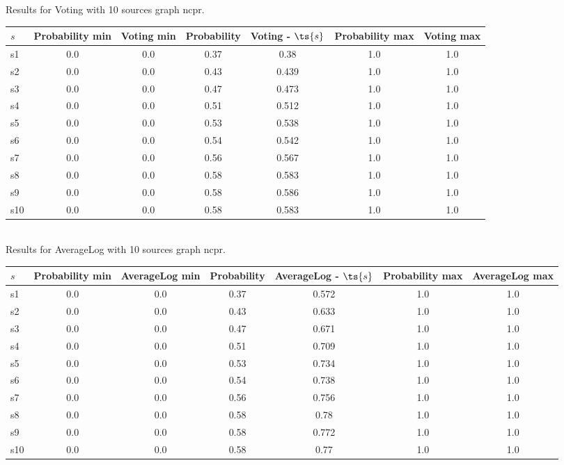 \documentclass{article}
\begin{document}
\noindent Results for Voting with 10 sources graph ncpr.

\noindent\begin{tabular}{|l|c|c|c|c|c|c|}
\hline
$s$& Probability min & Voting min & Probability & Voting - $\ts{s}$ & Probability max & Voting max\\
\hline
s1 &0.0 & 0.0 & 0.37 & 0.38 & 1.0 & 1.0\\
\hline
s2 &0.0 & 0.0 & 0.43 & 0.439 & 1.0 & 1.0\\
\hline
s3 &0.0 & 0.0 & 0.47 & 0.473 & 1.0 & 1.0\\
\hline
s4 &0.0 & 0.0 & 0.51 & 0.512 & 1.0 & 1.0\\
\hline
s5 &0.0 & 0.0 & 0.53 & 0.538 & 1.0 & 1.0\\
\hline
s6 &0.0 & 0.0 & 0.54 & 0.542 & 1.0 & 1.0\\
\hline
s7 &0.0 & 0.0 & 0.56 & 0.567 & 1.0 & 1.0\\
\hline
s8 &0.0 & 0.0 & 0.58 & 0.583 & 1.0 & 1.0\\
\hline
s9 &0.0 & 0.0 & 0.58 & 0.586 & 1.0 & 1.0\\
\hline
s10 &0.0 & 0.0 & 0.58 & 0.583 & 1.0 & 1.0\\
\hline
\end{tabular}\\

\noindent Results for AverageLog with 10 sources graph ncpr.

\noindent\begin{tabular}{|l|c|c|c|c|c|c|}
\hline
$s$& Probability min & AverageLog min & Probability & AverageLog - $\ts{s}$ & Probability max & AverageLog max\\
\hline
s1 &0.0 & 0.0 & 0.37 & 0.572 & 1.0 & 1.0\\
\hline
s2 &0.0 & 0.0 & 0.43 & 0.633 & 1.0 & 1.0\\
\hline
s3 &0.0 & 0.0 & 0.47 & 0.671 & 1.0 & 1.0\\
\hline
s4 &0.0 & 0.0 & 0.51 & 0.709 & 1.0 & 1.0\\
\hline
s5 &0.0 & 0.0 & 0.53 & 0.734 & 1.0 & 1.0\\
\hline
s6 &0.0 & 0.0 & 0.54 & 0.738 & 1.0 & 1.0\\
\hline
s7 &0.0 & 0.0 & 0.56 & 0.756 & 1.0 & 1.0\\
\hline
s8 &0.0 & 0.0 & 0.58 & 0.78 & 1.0 & 1.0\\
\hline
s9 &0.0 & 0.0 & 0.58 & 0.772 & 1.0 & 1.0\\
\hline
s10 &0.0 & 0.0 & 0.58 & 0.77 & 1.0 & 1.0\\
\hline
\end{tabular}\\
\end{document}
